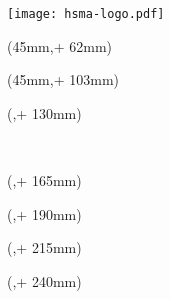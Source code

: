 \noindent\texttt{[image: hsma-logo.pdf]}\\

\begin{textblock*}{128mm}(45mm,\seitenanfang + 62mm) %
  \centering\Large\sffamily
  \vspace{4mm} %
  \textbf{\hsmatitel}
\end{textblock*}%

\begin{textblock*}{128mm}(45mm,\seitenanfang + 103mm)
  \centering\large\sffamily
  \hsmaautor
\end{textblock*}

\begin{textblock*}{\seitenbreite}(\bindekorrektur,\seitenanfang + 130mm)
  \centering\large\sffamily
  \hsmatyp\\
  \begin{small}\hsmathesistype \end{small}\\
  \vspace{2mm}
  \hsmastudiengangname
\end{textblock*}

\begin{textblock*}{\seitenbreite}(\bindekorrektur,\seitenanfang + 165mm)
  \centering\large\sffamily
  \hsmafakultaetlang\\
  \vspace{2mm}
  \hsmakoerperschaft
\end{textblock*}

\begin{textblock*}{\seitenbreite}(\bindekorrektur,\seitenanfang + 190mm)
  \centering\large 
  \textsf{\hsmadatum}
\end{textblock*}

\begin{textblock*}{\seitenbreite}(\bindekorrektur,\seitenanfang + 215mm)
  \centering\large 
\end{textblock*}

\begin{textblock*}{\seitenbreite}(\bindekorrektur,\seitenanfang + 240mm)
  \centering\large\sffamily
  \hsmatutor \\
  \vspace{2mm}
  \hsmabetreuer\\
  \vspace{2mm}
  \hsmazweitkorrektor
\end{textblock*}

